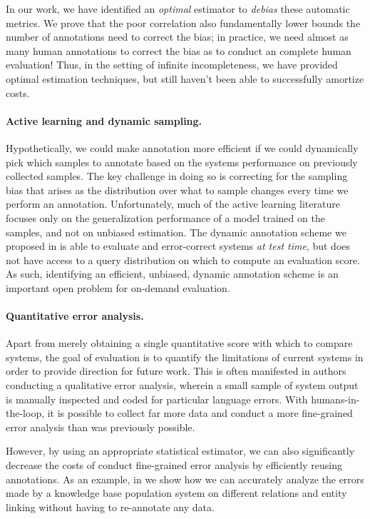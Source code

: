 In our work, we have identified an \textit{optimal} estimator to \textit{debias} these automatic metrics.
We prove that the poor correlation also fundamentally lower bounds the number of annotations need to correct the bias;
  in practice, we need almost as many human annotations to correct the bias as to conduct an complete human evaluation!
Thus, in the setting of infinite incompleteness, we have provided optimal estimation techniques, but still haven't been able to successfully amortize costs.

\paragraph{Active learning and dynamic sampling.}
Hypothetically, we could make annotation more efficient if we could dynamically pick which samples to annotate based on the systems performance on previously collected samples.
The key challenge in doing so is correcting for the sampling bias that arises as the distribution over what to sample changes every time we perform an annotation.
Unfortunately, much of the active learning literature focuses only on the generalization performance of a model trained on the samples, and not on unbiased estimation.
The dynamic annotation scheme we proposed in  is able to evaluate and error-correct systems \textit{at test time}, but does not have access to a query distribution on which to compute an evaluation score.
As such, identifying an efficient, unbiased, dynamic annotation scheme is an important open problem for on-demand evaluation.

\paragraph{Quantitative error analysis.}
Apart from merely obtaining a single quantitative score with which to compare systems, the goal of evaluation is to quantify the limitations of current systems in order to provide direction for future work.
This is often manifested in authors conducting a qualitative error analysis, wherein a small sample of system output is manually inspected and coded for particular language errors.
With humans-in-the-loop, it is possible to collect far more data and conduct a more fine-grained error analysis than was previously possible.

However, by using an appropriate statistical estimator, we can also significantly decrease the costs of conduct fine-grained error analysis by efficiently reusing annotations.
As an example, in  we show how we can accurately analyze the errors made by a knowledge base population system on different relations and entity linking without having to re-annotate any data.

